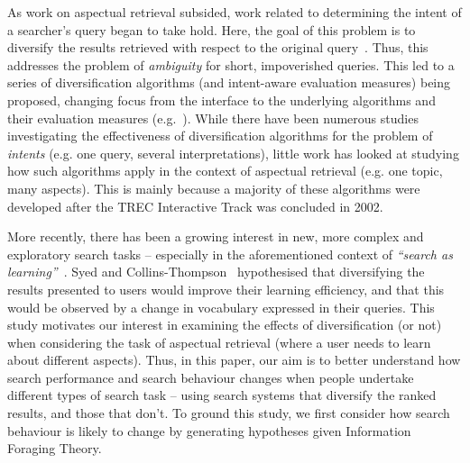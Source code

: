 
As work on aspectual retrieval subsided, work related to determining the intent of a searcher's query began to take hold. Here, the goal of this problem is to diversify the results retrieved with respect to the original query~\cite{rose2004understanding_user_goals}. Thus, this addresses the problem of \emph{ambiguity} for short, impoverished queries. This led to a series of diversification algorithms (and intent-aware evaluation measures) being proposed, changing focus from the interface to the underlying algorithms and their evaluation measures (e.g.~\cite{agrawal2009diversification,carbonell1998mmr,carterette2009probabalistic,chen2006lessismore,he2011diversification_clustering,radlinski2006diversification,santos2010query_reformulations_diversification,santos2011intent,zhai2015subtopics,zuccon2009qprp}). While there have been numerous studies investigating the effectiveness of diversification algorithms for the problem of \emph{intents} (e.g. one query, several interpretations), little work has looked at studying how such algorithms apply in the context of aspectual retrieval (e.g. one topic, many aspects). This is mainly because a majority of these algorithms were developed after the TREC Interactive Track was concluded in 2002.

More recently, there has been a growing interest in new, more complex and exploratory search tasks -- especially in the aforementioned context of \emph{``search as learning''}~\cite{collins2017sal}. Syed and Collins-Thompson~\cite{syed2017sal} hypothesised that diversifying the results presented to users would improve their learning efficiency, and that this would be observed by a change in vocabulary expressed in their queries. This study motivates our interest in examining the effects of diversification (or not) when considering the task of aspectual retrieval (where a user needs to learn about different aspects). Thus, in this paper, our aim is to better understand how search performance and search behaviour changes when people undertake different types of search task -- using search systems that diversify the ranked results, and those that don't. To ground this study, we first consider how search behaviour is likely to change by generating hypotheses given Information Foraging Theory.

